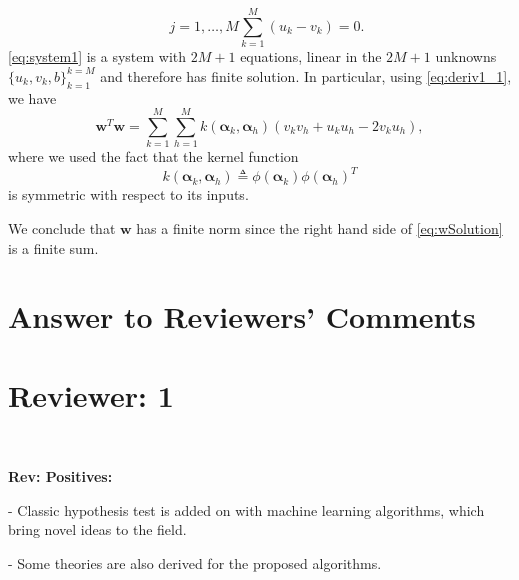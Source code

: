 \documentclass[draftcls,onecolumn,12pt]{IEEEtran}
\newcommand{\wrt}{with respect to }
\begin{document}
{\begin{subequations}
\begin{equation}
		\quad j=1,\dots, M
		\end{equation}
		\begin{equation}
		\sum_{k=1}^{M} (u_k - v_k) = 0.
		\end{equation}
	\end{subequations}
	\eqref{eq:system1} is a system with $2M + 1$ equations, linear in the $2M + 1$ unknowns $\{u_k,v_k,b\}_{k=1}^{k=M}$ and therefore has finite solution. In particular, using \eqref{eq:deriv1_1}, we have
	\begin{equation}
	\label{eq:wSolution}
	\bm{w}^T\bm{w} =  \sum_{k=1}^{M} \sum_{h=1}^{M} k(\bm{\alpha}_k,\bm{\alpha}_h) (v_kv_h + u_ku_h -2 v_ku_h),
	\end{equation}
	where we used the fact that the kernel function
	\begin{equation}
	k(\bm{\alpha}_k,\bm{\alpha}_h) \triangleq \phi(\bm{\alpha}_k) \phi(\bm{\alpha}_h)^T
	\end{equation}
	 is symmetric \wrt its inputs. 
	
	
	We conclude that $\bm{w}$ has a finite norm since the right hand side of \eqref{eq:wSolution} is a finite sum.
	  


%
%
\renewcommand*{\bibfont}{\footnotesize}

\printbibliography

\clearpage
\section*{Answer to Reviewers' Comments}
\section*{Reviewer: 1}

~


\begin{framed}
 {\bf Rev: Positives:

- Classic hypothesis test is added on with machine learning algorithms, which bring novel ideas to the field.

- Some theories are also derived for the proposed algorithms.

}
\end{framed}}
\end{document}
